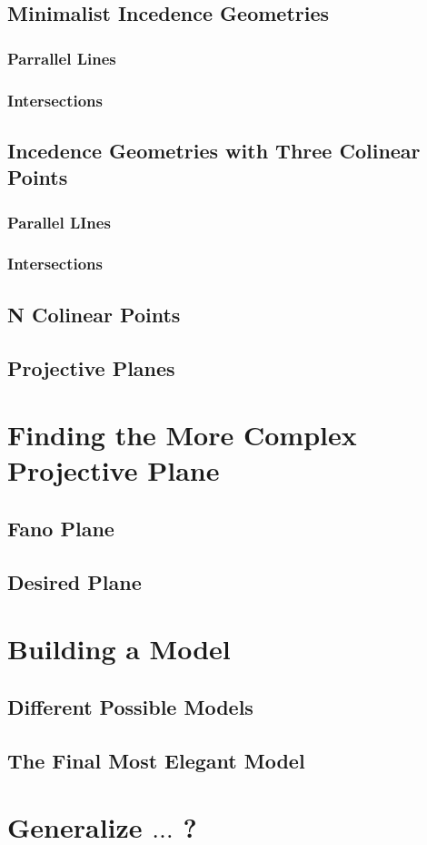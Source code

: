 \documentclass{article}
\begin{document}
\subsection{Minimalist Incedence Geometries}
\subsubsection{Parrallel Lines}
\subsubsection{Intersections}

\subsection{Incedence Geometries with Three Colinear Points}
\subsubsection{Parallel LInes}
\subsubsection{Intersections}

\subsection{N Colinear Points}

\subsection{Projective Planes}

\section{Finding the More Complex Projective Plane}

\subsection{Fano Plane}
\subsection{Desired Plane}

\section{Building a Model}

\subsection{Different Possible Models}
\subsection{The Final Most Elegant Model}

\section{Generalize $\dots$ ?}
\end{document}

